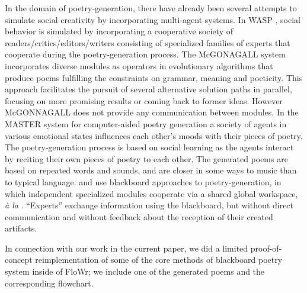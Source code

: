 In the domain of poetry-generation, there have already been several attempts to simulate social creativity by incorporating multi-agent systems. 
%
In WASP \cite{gervas10}, social behavior is simulated by incorporating a cooperative society of readers/critics/editors/writers consisting of specialized families of experts that cooperate during the poetry-generation process.
%
The McGONAGALL system \cite{manurung12} incorporates diverse modules as operators in evolutionary algorithms that produce poems fulfilling the constraints on grammar, meaning and poeticity.  This approach facilitates the pursuit of several alternative solution paths in parallel, focusing on more promising results or coming back to former ideas. However McGONNAGALL does not provide any communication between modules.
%
In the MASTER system for computer-aided poetry generation \cite{kirke13} a society of agents in various emotional states influences each other's moods with their pieces of poetry. The poetry-generation process is based on social learning as the agents interact by reciting their own pieces of poetry to each other. The generated poems are based on repeated words and sounds, and are closer in some ways to music than to typical language.
%
\citet{slant13} and \citet{misztal2014poetry}  use blackboard approaches to poetry-generation, in which independent specialized modules cooperate via a shared global workspace, \emph{\`a la} \cite{baars97}. ``Experts'' exchange information using the blackboard, but without direct communication and without feedback about the reception of their created artifacts. 

In connection with our work in the current paper, we did a limited proof-of-concept reimplementation of some of the core methods of blackboard poetry system inside of FloWr; we include one of the generated poems and the corresponding flowchart. 



